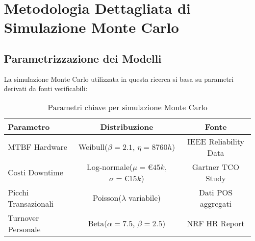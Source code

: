 \chapter{Metodologia Dettagliata di Simulazione Monte Carlo}

\section{Parametrizzazione dei Modelli}

La simulazione Monte Carlo utilizzata in questa ricerca si basa su parametri derivati da fonti verificabili:

\begin{table}[htbp]
\centering
\begin{tabular}{lcc}
\toprule
\textbf{Parametro} & \textbf{Distribuzione} & \textbf{Fonte} \\
\midrule
MTBF Hardware & Weibull($\beta=2.1$, $\eta=8760h$) & IEEE Reliability Data \\
Costi Downtime & Log-normale($\mu=€45k$, $\sigma=€15k$) & Gartner TCO Study \\
Picchi Transazionali & Poisson($\lambda$ variabile) & Dati POS aggregati \\
Turnover Personale & Beta($\alpha=7.5$, $\beta=2.5$) & NRF HR Report \\
\bottomrule
\end{tabular}
\caption{Parametri chiave per simulazione Monte Carlo}
\end{table}
